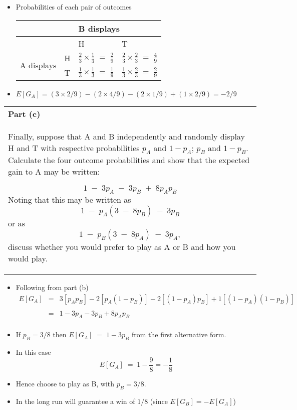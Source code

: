 \documentclass[a4paper,12pt]{article}
\begin{document}
	\begin{itemize}
		\item Probabilities of each pair of outcomes
		
		
		\begin{center}
			\begin{tabular}{|ll|l|l|}\hline
				\multicolumn{2}{|l}{}   & \multicolumn{2}{l|}{B displays} \\ \hline
				\multicolumn{2}{|l|}{}   & H      & T      \\ \hline 
				\multirow{2}{*}{A displays} & H  &  $\frac{2}{3} \times \frac{1}{3}  \;=\; \frac{2}{9}$ & $\frac{2}{3} \times \frac{2}{3}  \;=\; \frac{4}{9}$ \\ 
				&  T &  $\frac{1}{3} \times \frac{1}{3}  \;=\; \frac{1}{9}$ & $\frac{1}{3} \times \frac{2}{3}  \;=\; \frac{2}{9}$ \\ \hline \end{tabular}
		\end{center}
		
		\item $E[G_A] = (3 \times 2/9) - (2 \times 4/9) - (2 \times 1/9) + (1 \times 2/9) = -2/9$
	\end{itemize}
	
	
	\newpage
	\begin{table}[ht!]
		\centering
		\begin{tabular}{|p{15cm}|}
			\hline  
			\noindent \textbf{Part (c)} \\ \large 
			Finally, suppose that A and B independently and randomly display H and T with respective probabilities $p_A$ and $1- p_A$;  $p_B$ and $1- p_B$.  Calculate the four outcome probabilities and show that the expected gain to A may be written: 
			
			\[1 \;-\; 3p_A \;-\; 3p_B \;+\; 8p_Ap_B\]
			\large 
			Noting that this may be written as \[1\;-\; p_A(3\;-\;8p_B)\;-\; 3p_B\] or as \[1\;-\; p_B(3 \;-\;8p_A)\;-\; 3p_A,\] discuss whether you would prefer to play as A or B and how you would play. \\ \hline
		\end{tabular}
	\end{table}
	\large
	\begin{itemize}
		\item Following from part (b)
		\begin{eqnarray*}
			E[G_A] &=& 3\left[p_Ap_B\right] - 2\left[p_A(1 - p_B)\right] - 2\left[(1 - p_A)p_B\right] + 1\left[(1 - p_A)(1 - p_B)\right]\\ & & \\ &=& 1 - 3p_A -
			3p_B + 8p_Ap_B\\
		\end{eqnarray*}
		\item If $p_B = 3/8$ then $E[G_A] \;=\; 1 - 3p_B$ from the first alternative form. 
		\item In this case \[E[G_A] \;=\; 1 - \frac{9}{8}  = - \frac{1}{8}\]
		\item Hence choose to play as B, with $p_B = 3/8$. 
		\item In the long run will guarantee a win of $1/8$
		(since $E[G_B] = -E[G_A]$)
	\end{itemize}
\end{document}
